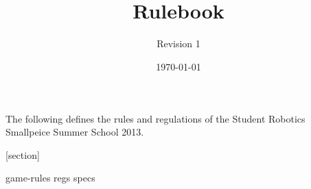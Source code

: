 \documentclass[a4paper, 11pt]{scrartcl}
\title {\compname \\ Rulebook}
\author{Revision 1}
\date{\today}
\newcommand{\compname}{Student Robotics Smallpeice Summer School 2013}
\begin{document}
\maketitle

\noindent The following defines the rules and regulations of the \compname.

[section]
\newcommand{\rcn}{\stepcounter{rule}\arabic{section}.\arabic{rule}}
\renewcommand{\labelenumi}{\rcn}

 {game-rules}
\newpage
 {regs}
\newpage
 {specs}

\appendix

\newpage


\end{document}
